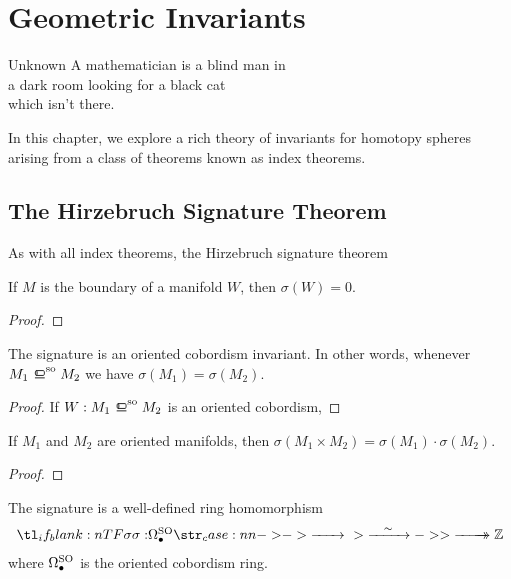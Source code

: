 \chapter{Geometric Invariants}\label{chap:invariants}

\begin{epigraph}{15em}{Unknown}
	A mathematician is a blind man in \\
	a dark room looking for a black cat \\
	which isn’t there.
\end{epigraph}

In this chapter, we explore a rich theory of invariants for homotopy spheres arising from a class of theorems known as index theorems.

\section{The Hirzebruch Signature Theorem}\label{sec:hirzebruch-signature-theorem}

As with all index theorems, the Hirzebruch signature theorem

\begin{proposition}
	If $M$ is the boundary of a manifold $W$, then $\sigma(W)=0$.
\end{proposition}
\begin{proof}
\end{proof}

\begin{corollary}
	The signature is an oriented cobordism invariant. In other words, whenever $M_1\sobord M_2$ we have $\sigma(M_1)=\sigma(M_2)$.
\end{corollary}
\begin{proof}
	If $W : M_1\sobord M_2$ is an oriented cobordism,
\end{proof}

\begin{proposition}
	If $M_1$ and $M_2$ are oriented manifolds, then $\sigma(M_1\times M_2)=\sigma(M_1)\cdot \sigma(M_2)$.
\end{proposition}

\begin{proof}
\end{proof}

\begin{corollary}
	The signature is a well-defined ring homomorphism
	\[
		\lkxfunc{\sigma}{\Omega^\SO_\bullet}{\Z}
	\]
	where $\Omega^{\mathrm{SO}}_\bullet$ is the oriented cobordism ring. 
\end{corollary}

